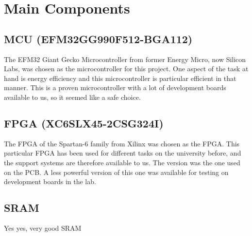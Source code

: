 \documentclass[../main/report.tex]{subfiles}
\begin{document}
\section{Main Components}

\subsection*{MCU (EFM32GG990F512-BGA112)}
The EFM32 Giant Gecko Microcontroller from former Energy Micro, now Silicon Labs, was chosen as the microcontroller for this project.
One aspect of the task at hand is energy efficiency and this microcontroller is particular efficient in that manner.
This is a proven microcontroller with a lot of development boards available to us, so it seemed like a safe choice.

\subsection*{FPGA (XC6SLX45-2CSG324I)}
The  FPGA of the Spartan-6 family from Xilinx was chosen as the FPGA.
This particular FPGA has been used for different tasks on the university before, and the support systems are therefore available to us.
The version was the one used on the PCB.
A less powerful version of this one was available for testing on development boards in the lab.

\subsection*{SRAM}
Yes yes, very good SRAM 
\end{document}
